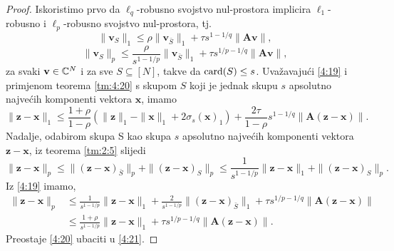 \documentclass[a4paper,twoside,12pt]{memoir} %
\newcommand{\vect}[1]{\mathbf{#1}}
\renewcommand{\vec}{\vect}
\newcommand{\card}{\text{\normalfont{card}}}
\newcommand{\norm}[1]{\|{#1}\|}
\begin{document}
\begin{proof}
    Iskoristimo prvo da $\ell_q$-robusno svojstvo nul-prostora implicira $\ell_1$-robusno i $\ell_p$-robusno svojstvo nul-prostora, tj.
    \begin{equation}\label{4:18}
        \norm{\vec v_S}_1 \leq \rho \norm{\vec v_{\bar S}}_1 + \tau s^{1-1/q} \norm{\vec{Av}},
    \end{equation}
    \begin{equation}\label{4:19}
        \norm{\vec v_S}_p \leq \frac{\rho}{s^{1-1/p}} \norm{\vec v_{\bar S}}_1 + \tau s^{1/p - 1/q} \norm{\vec{Av}},
    \end{equation}
    za svaki $\vec v \in \C^N$ i za sve $S \subseteq [N]$, takve da $\card(S) \leq s$. Uva\v{z}avaju\'ci \eqref{4:19} i primjenom teorema \ref{tm:4:20} s skupom $S$ koji je jednak skupu $s$ apsolutno najve\'cih komponenti vektora $\vec x$, imamo
    \begin{equation}\label{4:20}
        \norm{\vec z - \vec x}_1 \leq \frac{1+\rho}{1-\rho}(\norm{\vec z }_1 - \norm{\vec x}_1 + 2 \sigma_s(\vec x)_1)+ \frac{2 \tau}{1 - \rho}s^{1-1/q} \norm{\vec A (\vec z - \vec x)}.
    \end{equation}
    Nadalje, odabirom skupa S kao skupa $s$ apsolutno najve\'cih komponenti vektora $\vec z - \vec x$, iz teorema \ref{tm:2:5} slijedi
    \begin{equation*}
        \norm{\vec z - \vec x}_p \leq \norm{(\vec z - \vec x)_{\bar S}}_p + \norm{(\vec z - \vec x)_S}_p \leq \frac{1}{s^{1-1/p}}\norm{\vec z - \vec x}_1 + \norm{(\vec z - \vec x)_S}_p.
    \end{equation*}
    Iz \eqref{4:19} imamo,
    \begin{align}\label{4:21}
        \norm{\vec z - \vec x}_p &\leq \frac{1}{s^{1-1/p}} \norm{\vec z - \vec x}_1 + \frac{2}{s^{1-1/p}} \norm{(\vec z - \vec x)_{\bar S}}_1 + \tau s^{1/p - 1/q} \norm{\vec A (\vec z - \vec x)}\nonumber \\
        &\leq  \frac{1+\rho}{s^{1-1/p}}  \norm{\vec z - \vec x}_1 + \tau s^{1/p - 1/q} \norm{ \vec A (\vec z - \vec x)}.
    \end{align}
    Preostaje \eqref{4:20} ubaciti u \eqref{4:21}.
\end{proof}
\end{document}
